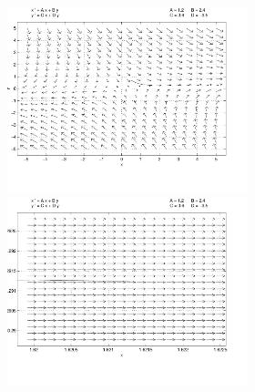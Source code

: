 \documentclass{ximera}
\begin{document}
\begin{computerExercise}
\begin{solution}
\begin{figure}[htb]
                       \centerline{%
                       \includegraphics[width=2.75in]{exfigure/4-9-9a.pdf}
                       \includegraphics[width=2.75in]{exfigure/4-9-9b.pdf}}
\end{figure}



\end{solution}
\end{computerExercise}
\end{document}
